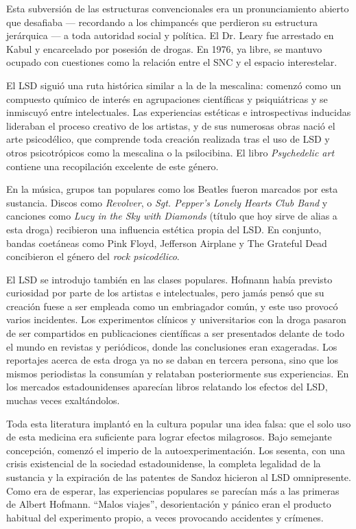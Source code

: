 Esta subversión de las estructuras convencionales era un pronunciamiento abierto que desafiaba --- recordando a los chimpancés que perdieron su estructura jerárquica --- a toda autoridad social y política. El Dr. Leary fue arrestado en Kabul y encarcelado por posesión de drogas. En 1976, ya libre, se mantuvo ocupado con cuestiones como la relación entre el SNC y el espacio interestelar.

El LSD siguió una ruta histórica similar a la de la mescalina: comenzó como un compuesto químico de interés en agrupaciones científicas y psiquiátricas y se inmiscuyó entre intelectuales. Las experiencias estéticas e introspectivas inducidas lideraban el proceso creativo de los artistas, y de sus numerosas obras nació el arte psicodélico, que comprende toda creación realizada tras el uso de LSD y otros psicotrópicos como la mescalina o la psilocibina. El libro \textit{Psychedelic art} contiene una recopilación excelente de este género.

En la música, grupos tan populares como los Beatles fueron marcados por esta sustancia. Discos como \textit{Revolver}, o \textit{Sgt. Pepper’s Lonely Hearts Club Band} y canciones como \textit{Lucy in the Sky with Diamonds} (título que hoy sirve de alias a esta droga) recibieron una influencia estética propia del LSD. En conjunto, bandas coetáneas como Pink Floyd, Jefferson Airplane y The Grateful Dead concibieron el género del \textit{rock psicodélico}.

El LSD se introdujo también en las clases populares. Hofmann había previsto curiosidad por parte de los artistas e intelectuales, pero jamás pensó que su creación fuese a ser empleada como un embriagador común, y este uso provocó varios incidentes. Los experimentos clínicos y universitarios con la droga pasaron de ser compartidos en publicaciones científicas a ser presentados delante de todo el mundo en revistas y periódicos, donde las conclusiones eran exageradas. Los reportajes acerca de esta droga ya no se daban en tercera persona, sino que los mismos periodistas la consumían y relataban posteriormente sus experiencias. En los mercados estadounidenses aparecían libros relatando los efectos del LSD, muchas veces exaltándolos.

Toda esta literatura implantó en la cultura popular una idea falsa: que el solo uso de esta medicina era suficiente para lograr efectos milagrosos. Bajo semejante concepción, comenzó el imperio de la autoexperimentación. Los sesenta, con una crisis existencial de la sociedad estadounidense, la completa legalidad de la sustancia y la expiración de las patentes de Sandoz hicieron al LSD omnipresente. Como era de esperar, las experiencias populares se parecían más a las primeras de Albert Hofmann. \enquote{Malos viajes}, desorientación y pánico eran el producto habitual del experimento propio, a veces provocando accidentes y crímenes.

